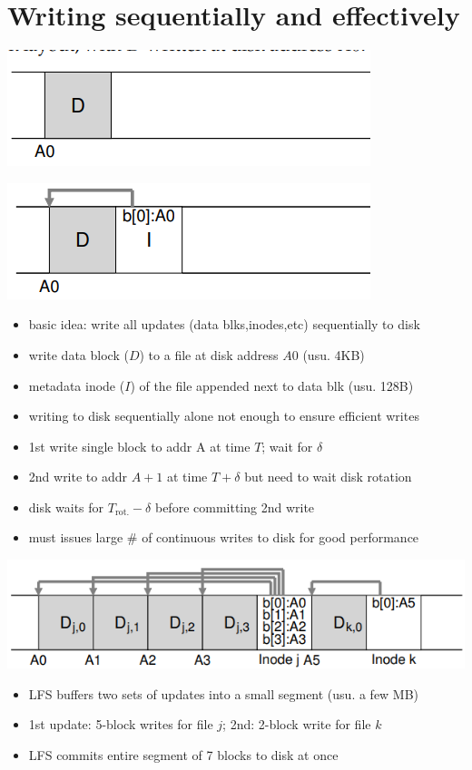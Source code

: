 \section*{Writing sequentially and effectively}
\begin{minipage}{.5\linewidth}
  \includegraphics[width=\linewidth]{imgs/lfs_seq1}
\end{minipage}
\begin{minipage}{.5\linewidth}
  \includegraphics[width=\linewidth]{imgs/lfs_seq2}
\end{minipage}
\begin{itemize}
\item basic idea: write all updates (data blks,inodes,etc) sequentially to disk
\item write data block ($D$) to a file at disk address $A0$ (usu. 4KB)
\item metadata inode ($I$) of the file appended next to data blk (usu. 128B)
\item writing to disk sequentially alone not enough to ensure efficient writes
\item 1st write single block to addr A at time $T$; wait for $\delta$
\item 2nd write to addr $A+1$ at time $T+\delta$ but need to wait disk rotation
\item disk waits for $T_{\text{rot.}} - \delta$ before committing 2nd write
\item must issues large \# of continuous writes to disk for good performance
\end{itemize}
\includegraphics[width=\linewidth]{imgs/lfs_buf}
\begin{itemize}
\item LFS buffers two sets of updates into a small segment (usu. a few MB)
\item 1st update: 5-block writes for file $j$; 2nd: 2-block write for file $k$
\item LFS commits entire segment of 7 blocks to disk at once
\end{itemize}
